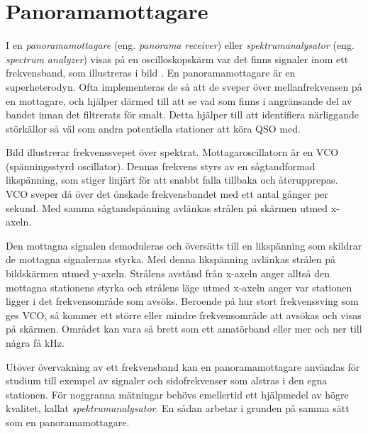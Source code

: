 \section{Panoramamottagare}


I en \emph{panoramamottagare} (eng. \emph{panorama receiver}) eller
\emph{spektrumanalysator} (eng. \emph{spectrum analyzer}) visas på en
oscilloskopskärm var det finns signaler inom ett frekvensband, som illustreras
i bild .
En panoramamottagare är en superheterodyn.
Ofta implementeras de så att de sveper över mellanfrekvensen på en mottagare,
och hjälper därmed till att se vad som finns i angränsande del av bandet innan
det filtrerats för smalt.
Detta hjälper till att identifiera närliggande störkällor så väl som andra
potentiella stationer att köra QSO med.


Bild  illustrerar frekvenssvepet över spektrat.
Mottagaroscillatorn är en VCO (spänningsstyrd oscillator).
Dennas frekvens styrs av en sågtandformad likspänning, som stiger linjärt för
att snabbt falla tillbaka och återupprepas.
VCO sveper då över det önskade frekvensbandet med ett antal gånger per sekund.
Med samma sågtandspänning avlänkas strålen på skärmen utmed x-axeln.

Den mottagna signalen demoduleras och översätts till en likspänning
som skildrar de mottagna signalernas styrka.
Med denna likspänning avlänkas strålen på bildskärmen utmed y-axeln.
Strålens avstånd från x-axeln anger alltså den mottagna stationens styrka
och strålens läge utmed x-axeln anger var stationen ligger i det
frekvensområde som avsöks.
Beroende på hur stort frekvenssving som ges VCO, så kommer ett större eller
mindre frekvensområde att avsökas och visas på skärmen.
Området kan vara så brett som ett amatörband eller mer och ner till några
få \unit{\kilo\hertz}.

Utöver övervakning av ett frekvensband kan en panoramamottagare användas för
studium till exempel av signaler och sidofrekvenser som alstras i den egna stationen.
För noggranna mätningar behövs emellertid ett hjälpmedel av högre kvalitet,
kallat \emph{spektrumanalysator}.
En sådan arbetar i grunden på samma sätt som en panoramamottagare.

